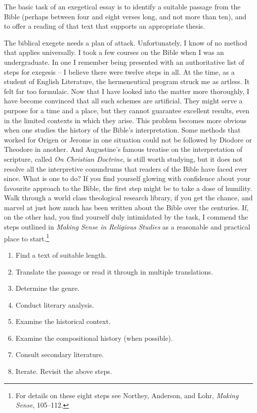 \documentclass[11pt]{article}
\begin{document}
The basic task of an exegetical essay is to identify a suitable passage
from the Bible (perhaps between four and eight verses long, and not more
than ten), and to offer a reading of that text that supports an
appropriate thesis.

The biblical exegete needs a plan of attack. Unfortunately, I know of no
method that applies universally. I took a few courses on the Bible when
I was an undergraduate. In one I remember being presented with an
authoritative list of steps for exegesis – I believe there were twelve
steps in all. At the time, as a student of English Literature, the
hermeneutical program struck me as artless. It felt far too formulaic.
Now that I have looked into the matter more thoroughly, I have become
convinced that all such schemes are artificial. They might serve a
purpose for a time and a place, but they cannot guarantee excellent
results, even in the limited contexts in which they arise. This problem
becomes more obvious when one studies the history of the Bible's
interpretation. Some methods that worked for Origen or Jerome in one
situation could not be followed by Diodore or Theodore in another. And
Augustine's famous treatise on the interpretation of scripture, called
\emph{On Christian Doctrine}, is still worth studying, but it does not
resolve all the interpretive conundrums that readers of the Bible have
faced ever since. What is one to do? If you find yourself glowing with
confidence about your favourite approach to the Bible, the first step
might be to take a dose of humility. Walk through a world class
theological research library, if you get the chance, and marvel at just
how much has been written about the Bible over the centuries. If, on the
other had, you find yourself duly intimidated by the task, I commend the
steps outlined in \emph{Making Sense in Religious Studies} as a
reasonable and practical place to start.\footnote{For details on these
eight steps see Northey, Anderson, and Lohr, \emph{Making Sense},
105–112.}

\begin{enumerate}

\item Find a text of suitable length.

\item Translate the passage or read it through in multiple translations.

\item Determine the genre.

\item Conduct literary analysis.

\item Examine the historical context.

\item Examine the compositional history (when possible).

\item Consult secondary literature.

\item Iterate. Revisit the above steps.

\end{enumerate}
\end{document}
